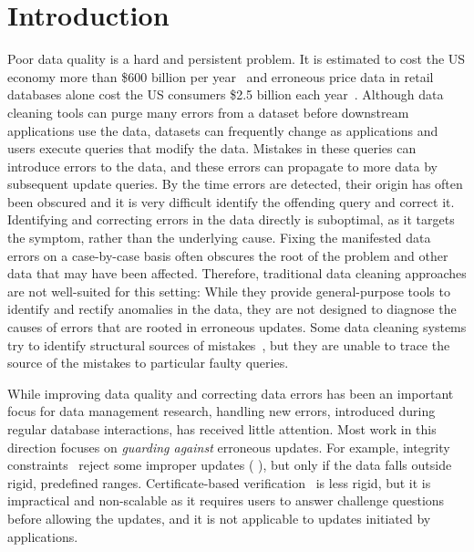 
\section{Introduction}
\label{s:intro}

Poor data quality is a hard and persistent problem.  
It is estimated to cost the US economy more than \$600 billion
per year~\cite{eckerson2002} and erroneous price data in retail databases
alone cost the US consumers \$2.5 billion each year~\cite{Fan2008}. 
Although data
cleaning tools can purge many errors from a dataset before downstream 
applications use the data, datasets can frequently change as applications
and users execute queries that modify the data.
Mistakes in these queries can introduce errors to the data, and these
errors can propagate to more data by subsequent update queries.
By the time errors are detected, their origin has often been obscured and it is very difficult identify the offending query and correct it.
Identifying and correcting errors in the data directly is suboptimal, as it targets the symptom,
rather than the underlying cause. Fixing the manifested data errors on a
case-by-case basis often obscures the root of the problem and other data that may have been
affected. Therefore, traditional data cleaning approaches are not well-suited
for this setting: While they provide general-purpose tools to identify and
rectify anomalies in the data, they are not designed to diagnose the causes of
errors that are rooted in erroneous updates.
Some data cleaning systems try to identify structural sources of
mistakes~\cite{wang2015}, but they are unable to trace the source of
the mistakes to particular faulty queries.

While improving data quality and correcting data errors has been an important
focus for data management research, handling new errors, introduced during
regular database interactions, has received little attention. Most work in
this direction focuses on \emph{guarding against} erroneous updates. For
example, integrity constraints~\cite{Khoussainova2006} reject some improper
updates ( ), 
but only if the data falls outside rigid, predefined ranges.
Certificate-based verification~\cite{Chen2011} is less rigid, but it is
impractical and non-scalable as it requires users to answer challenge
questions before allowing the updates, and it is not applicable to updates
initiated by applications.



